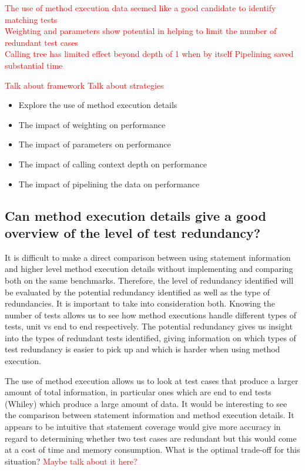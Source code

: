 \documentclass[11pt
              , a4paper
              , twoside
              , openright
              ]{report}
\newcommand\todo[1]{\textcolor{red}{#1}}
\begin{document}
\todo{The use of method execution data seemed like a good candidate to identify matching tests} \\
\todo{Weighting and parameters show potential in helping to limit the number of redundant test cases} \\
\todo{Calling tree has limited effect beyond depth of 1 when by itself}
\todo{Pipelining saved substantial time}

\todo{Talk about framework}
\todo{Talk about strategies}

\begin{itemize}
\item{Explore the use of method execution details}
\item{The impact of weighting on performance}
\item{The impact of parameters on performance}
\item{The impact of calling context depth on performance}
\item{The impact of pipelining the data on performance}
\end{itemize}

\subsection{Can method execution details give a good overview of the level of test redundancy?}

It is difficult to make a direct comparison between using statement information and higher level method execution details without implementing and comparing both on the same benchmarks. Therefore, the level of redundancy identified will be evaluated by the potential redundancy identified as well as the type of redundancies. It is important to take into consideration both. Knowing the number of tests allows us to see how method executions handle different types of tests, unit vs end to end respectively. The potential redundancy gives us insight into the types of redundant tests identified, giving information on which types of test redundancy is easier to pick up and which is harder when using method execution.

The use of method execution allows us to look at test cases that produce a larger amount of total information, in particular ones which are end to end tests (Whiley) which produce a large amount of data. It would be interesting to see the comparison between statement information and method execution details. It appears to be intuitive that statement coverage would give more accuracy in regard to determining whether two test cases are redundant but this would come at a cost of time and memory consumption. What is the optimal trade-off for this situation? \todo{Maybe talk about it here?}
\end{document}
